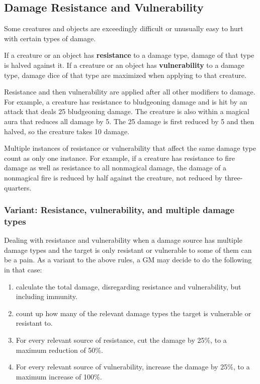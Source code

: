 \subsection{Damage Resistance and Vulnerability}

Some creatures and objects are exceedingly difficult or unusually easy to hurt with certain types of damage.

If a creature or an object has \textbf{resistance} to a damage type, damage of that type is halved against it. If a creature or an object has \textbf{vulnerability} to a damage type, damage dice of that type are maximized when applying to that creature.

Resistance and then vulnerability are applied after all other modifiers to damage. For example, a creature has resistance to bludgeoning damage and is hit by an attack that deals 25 bludgeoning damage. The creature is also within a magical aura that reduces all damage by 5. The 25 damage is first reduced by 5 and then halved, so the creature takes 10 damage.

Multiple instances of resistance or vulnerability that affect the same damage type count as only one instance. For example, if a creature has resistance to fire damage as well as resistance to all nonmagical damage, the damage of a nonmagical fire is reduced by half against the creature, not reduced by three-quarters.

\subsubsection{Variant: Resistance, vulnerability, and multiple damage types}
Dealing with resistance and vulnerability when a damage source has multiple damage types and the target is only resistant or vulnerable to some of them can be a pain. As a variant to the above rules, a GM may decide to do the following in that case:
\begin{enumerate}
    \item calculate the total damage, disregarding resistance and vulnerability, but including immunity.
    \item count up how many of the relevant damage types the target is vulnerable or resistant to.
    \item For every relevant source of resistance, cut the damage by 25\%, to a maximum reduction of 50\%.
    \item For every relevant source of vulnerability, increase the damage by 25\%, to a maximum increase of 100\%.
\end{enumerate}

